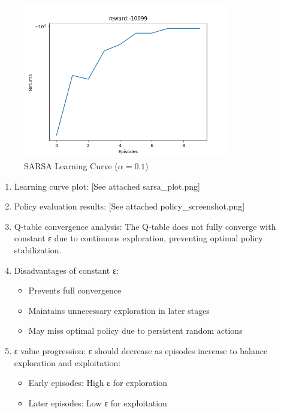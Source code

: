 \documentclass{article}
\begin{document}
\begin{figure}[h]
\centering
\includegraphics[width=0.8\textwidth]{sarsa_alpha_0.1.png}
\caption{SARSA Learning Curve ($\alpha=0.1$)}
\label{fig:sarsa_results}
\end{figure}
\begin{enumerate}[label=(\arabic*)]
\item Learning curve plot: [See attached sarsa\_plot.png]

\item Policy evaluation results: [See attached policy\_screenshot.png]

\item Q-table convergence analysis:
The Q-table does not fully converge with constant ε due to continuous exploration, preventing optimal policy stabilization.

\item Disadvantages of constant ε:
\begin{itemize}
    \item Prevents full convergence
    \item Maintains unnecessary exploration in later stages
    \item May miss optimal policy due to persistent random actions
\end{itemize}

\item ε value progression:
ε should decrease as episodes increase to balance exploration and exploitation:
\begin{itemize}
    \item Early episodes: High ε for exploration
    \item Later episodes: Low ε for exploitation
\end{itemize}
\end{enumerate}
\end{document}
